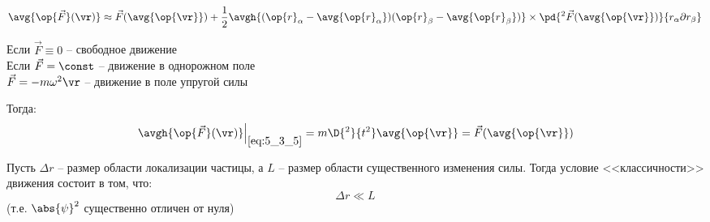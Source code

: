 \begin{equation}
\label{eq:5_3_8}
\avg{\op{\vec{F}}(\vr)} \approx \vec{F}(\avg{\op{\vr}}) + \frac{1}{2} \avgh{(\op{r}_\alpha - \avg{\op{r}_\alpha})(\op{r}_\beta - \avg{\op{r}_\beta})} \times \pd{^2 \vec{F}(\avg{\op{\vr}})}{r_\alpha \partial r_\beta}
\end{equation}

\noindent
Если $\vec{F} \equiv 0$ -- свободное движение\\
Если $\vec{F} = \const$ -- движение в однорожном поле\\
$\vec{F} = - m\omega^2 \vr$ -- движение в поле упругой силы

Тогда:
\begin{equation}
\label{eq:5_3_9}
\left. \avgh{\op{\vec{F}}(\vr)} \right|_{\eqref{eq:5_3_5}} = m \D{^2}{t^2} \avg{\op{\vr}} = \vec{F}(\avg{\op{\vr}})
\end{equation}

Пусть $\Delta r$ -- размер области локализации частицы, а $L$ -- размер области существенного изменения силы. Тогда условие <<классичности>> движения состоит в том, что:
\begin{equation}
\label{eq:5_3_10}
\Delta r \ll L
\end{equation}
(т.е. $\abs{\psi}^2$ существенно отличен от нуля)